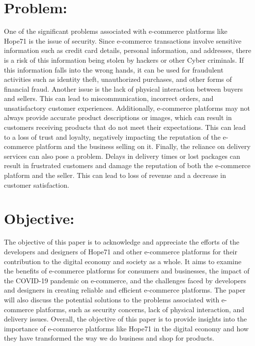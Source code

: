 \documentclass{article}
\begin{document}
\section{Problem:}
One of the significant problems associated with e-commerce platforms like Hope71 is the issue of security. Since e-commerce transactions involve sensitive information such as credit card details, personal information, and addresses, there is a risk of this information being stolen by hackers or other Cyber criminals. If this information falls into the wrong hands, it can be used for fraudulent activities such as identity theft, unauthorized purchases, and other forms of financial fraud. Another issue is the lack of physical interaction between buyers and sellers. This can lead to miscommunication, incorrect orders, and unsatisfactory customer experiences. Additionally, e-commerce platforms may not always provide accurate product descriptions or images, which can result in customers receiving products that do not meet their expectations. This can lead to a loss of trust and loyalty, negatively impacting the reputation of the e-commerce platform and the business selling on it. Finally, the reliance on delivery services can also pose a problem. Delays in delivery times or lost packages can result in frustrated customers and damage the reputation of both the e-commerce platform and the seller. This can lead to loss of revenue and a decrease in customer satisfaction.
\section{Objective:}
The objective of this paper is to acknowledge and appreciate the efforts of the developers and designers of Hope71 and other e-commerce platforms for their contribution to the digital economy and society as a whole. It aims to examine the benefits of e-commerce platforms for consumers and businesses, the impact of the COVID-19 pandemic on e-commerce, and the challenges faced by developers and designers in creating reliable and efficient e-commerce platforms. The paper will also discuss the potential solutions to the problems associated with e-commerce platforms, such as security concerns, lack of physical interaction, and delivery issues. Overall, the objective of this paper is to provide insights into the importance of e-commerce platforms like Hope71 in the digital economy and how they have transformed the way we do business and shop for products.
\end{document}
